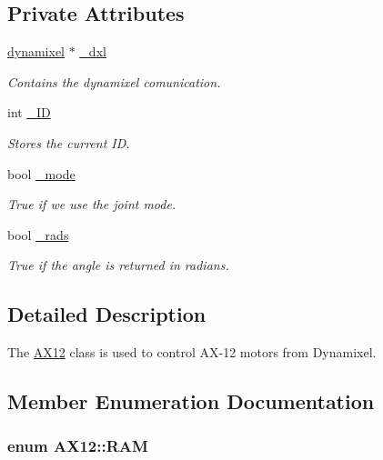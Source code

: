 \subsection*{Private Attributes}
\begin{DoxyCompactItemize}
\item 
\hyperlink{a00003}{dynamixel} $\ast$ \hyperlink{a00001_a16df7ccc0a8d3c585a93b6916734bb17}{\+\_\+dxl}
\begin{DoxyCompactList}\small\item\em Contains the dynamixel comunication. \end{DoxyCompactList}\item 
int \hyperlink{a00001_a0ae2b35fee3d120075e1d8f1e2055804}{\+\_\+\+I\+D}
\begin{DoxyCompactList}\small\item\em Stores the current I\+D. \end{DoxyCompactList}\item 
bool \hyperlink{a00001_a2fd07e2e636003227a32d09d211bd6d4}{\+\_\+mode}
\begin{DoxyCompactList}\small\item\em True if we use the joint mode. \end{DoxyCompactList}\item 
bool \hyperlink{a00001_aba71492043d7a3226f0793db57372bec}{\+\_\+rads}
\begin{DoxyCompactList}\small\item\em True if the angle is returned in radians. \end{DoxyCompactList}\end{DoxyCompactItemize}


\subsection{Detailed Description}
The \hyperlink{a00001}{A\+X12} class is used to control A\+X-\/12 motors from Dynamixel. 

\subsection{Member Enumeration Documentation}
\hypertarget{a00001_a672068c48bbee921e5856cc44b1c81c1}{}
\subsubsection[{R\+A\+M}]{\setlength{\rightskip}{0pt plus 5cm}enum {\bf A\+X12\+::\+R\+A\+M}\hspace{0.3cm}{\ttfamily [private]}}\label{a00001_a672068c48bbee921e5856cc44b1c81c1}


